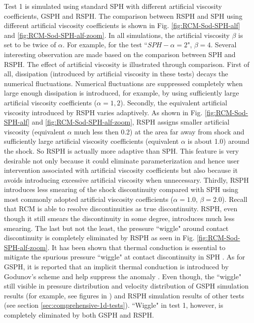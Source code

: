 \documentclass[review]{elsarticle}
\begin{document}
Test 1 is simulated using standard SPH with different artificial viscosity coefficients, GSPH and RSPH. The comparison between RSPH and SPH using different artificial viscosity coefficients is shown in Fig. \ref{fig:RCM-Sod-SPH-alf} and \ref{fig:RCM-Sod-SPH-alf-zoom}. In all simulations, the artificial viscosity $\beta$ is set to be twice of $\alpha$. For example, for the test ``$SPH-\alpha=2$", $\beta=4$. Several interesting observation are made based on the comparison between SPH and RSPH. The effect of artificial viscosity is illustrated through comparison.
First of all, dissipation (introduced by artificial viscosity in these tests) decays the numerical fluctuations. Numerical fluctuations are suppressed completely when large enough dissipation is introduced, for example, by using sufficiently large artificial viscosity coefficients ($\alpha=1,2$).
Secondly, the equivalent artificial viscosity  introduced by RSPH varies adaptively.
As shown in Fig. \ref{fig:RCM-Sod-SPH-alf} and \ref{fig:RCM-Sod-SPH-alf-zoom}, RSPH assigns smaller artificial viscosity  (equivalent $\alpha$ much less then 0.2) at the area far away from shock and sufficiently large artificial viscosity coefficients (equivalent $\alpha$ is about 1.0) around the shock. So RSPH is actually more adaptive than SPH. This feature is very desirable not only because it could eliminate parameterization and hence user intervention associated with artificial viscosity coefficients but also because it avoids introducing excessive artificial viscosity when unnecessary.
Thirdly, RSPH introduces less smearing of the shock discontinuity compared with SPH using most commonly adopted artificial viscosity coefficients ($\alpha=1.0$, $\beta=2.0$). Recall that RCM is able to resolve discontinuities as true discontinuity. RSPH, even though it still smears the discontinuity in some degree, introduces much less smearing.
The last but not the least, the pressure ``wiggle" around contact discontinuity is completely eliminated by RSPH as seen in Fig. \ref{fig:RCM-Sod-SPH-alf-zoom}. It has been shown that thermal conduction is essential to mitigate the spurious pressure ``wiggle" at contact discontinuity in SPH \citep{monaghan1997sph, sigalotti2006shock, price2008modelling, price2012smoothed}. As for GSPH, it is reported that an implicit thermal conduction is introduced by Godunov's scheme and help suppress the anomaly \citep{puri2014approximate}. Even though, the ``wiggle" still visible in pressure distribution and velocity distribution of GSPH simulation results (for example, see figures in \citep{puri2014comparison}) and RSPH simulation results of other tests (see section \ref{sec:comprehensive-1d-tests}). ``Wiggle" in test 1, however, is completely eliminated by both GSPH and RSPH.
\end{document}
